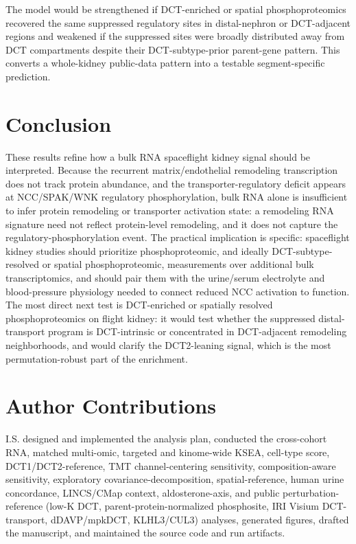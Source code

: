 \documentclass[11pt]{article}
\begin{document}
The model would be strengthened if DCT-enriched or spatial phosphoproteomics recovered the same suppressed regulatory sites in distal-nephron or DCT-adjacent regions and weakened if the suppressed sites were broadly distributed away from DCT compartments despite their DCT-subtype-prior parent-gene pattern. This converts a whole-kidney public-data pattern into a testable segment-specific prediction.

\section{Conclusion}

These results refine how a bulk RNA spaceflight kidney signal should be interpreted. Because the recurrent matrix/endothelial remodeling transcription does not track protein abundance, and the transporter-regulatory deficit appears at NCC/SPAK/WNK regulatory phosphorylation, bulk RNA alone is insufficient to infer protein remodeling or transporter activation state: a remodeling RNA signature need not reflect protein-level remodeling, and it does not capture the regulatory-phosphorylation event. The practical implication is specific: spaceflight kidney studies should prioritize phosphoproteomic, and ideally DCT-subtype-resolved or spatial phosphoproteomic, measurements over additional bulk transcriptomics, and should pair them with the urine/serum electrolyte and blood-pressure physiology needed to connect reduced NCC activation to function. The most direct next test is DCT-enriched or spatially resolved phosphoproteomics on flight kidney: it would test whether the suppressed distal-transport program is DCT-intrinsic or concentrated in DCT-adjacent remodeling neighborhoods, and would clarify the DCT2-leaning signal, which is the most permutation-robust part of the enrichment.

\section*{Author Contributions}
I.S. designed and implemented the analysis plan, conducted the cross-cohort RNA, matched multi-omic, targeted and kinome-wide KSEA, cell-type score, DCT1/DCT2-reference, TMT channel-centering sensitivity, composition-aware sensitivity, exploratory covariance-decomposition, spatial-reference, human urine concordance, LINCS/CMap context, aldosterone-axis, and public perturbation-reference (low-K DCT, parent-protein-normalized phosphosite, IRI Visium DCT-transport, dDAVP/mpkDCT, KLHL3/CUL3) analyses, generated figures, drafted the manuscript, and maintained the source code and run artifacts.
\end{document}
